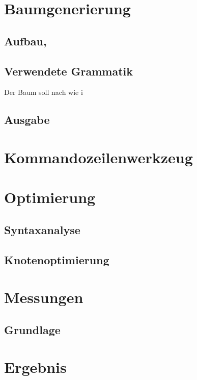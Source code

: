 \documentclass[11pt]{scrartcl}
\begin{document}
\pagebreak
\section{Baumgenerierung}
\subsection{Aufbau,}
\subsection{Verwendete Grammatik}
\label{tree_generation_used_grammar}
Der Baum soll nach wie i
\subsection{Ausgabe}

\pagebreak

\section{Kommandozeilenwerkzeug}

\pagebreak

\section{Optimierung}

\subsection{Syntaxanalyse}
\subsection{Knotenoptimierung}

\pagebreak
\section{Messungen}
\subsection{Grundlage}
\fancyhead[R]{}

\pagebreak
\section{Ergebnis}

\thispagestyle{empty}

\renewcommand*{\biburlprefix}{(URL: }
\renewcommand*{\biburlsuffix}{)}

\pagebreak
{} %


\appendix

\end{document}

